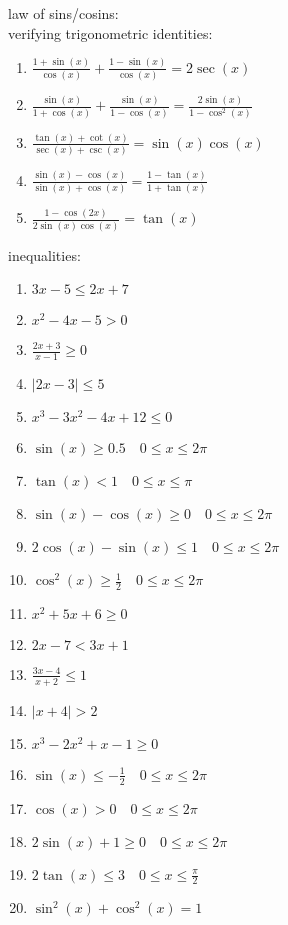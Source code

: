\documentclass{article}
\begin{document}
law of sins/cosins:\\

verifying trigonometric identities:
	\begin{enumerate}
		\item $\frac{1 + \sin(x)}{\cos(x)} + \frac{1 - \sin(x)}{\cos(x)} = 2\sec(x)$
		\item $\frac{\sin(x)}{1 + \cos(x)} + \frac{\sin(x)}{1 - \cos(x)} = \frac{2\sin(x)}{1 - \cos^2(x)}$
		\item $\frac{\tan(x) + \cot(x)}{\sec(x) + \csc(x)} = \sin(x)\cos(x)$
		\item $\frac{\sin(x) - \cos(x)}{\sin(x) + \cos(x)} = \frac{1 - \tan(x)}{1 + \tan(x)}$
		\item $\frac{1 - \cos(2x)}{2\sin(x)\cos(x)} = \tan(x)$
	\end{enumerate}

inequalities:
\begin{enumerate}
        \item $3x - 5 \leq 2x + 7$
        \item $x^2 - 4x - 5 > 0$
        \item $\frac{2x + 3}{x - 1} \geq 0$
        \item $|2x - 3| \leq 5$
        \item $x^3 - 3x^2 - 4x + 12 \leq 0$
        \item $\sin(x) \geq 0.5 \quad 0 \leq x \leq 2\pi$
        \item $\tan(x) < 1 \quad 0 \leq x \leq \pi$
        \item $\sin(x) - \cos(x) \geq 0 \quad 0 \leq x \leq 2\pi$
        \item $2\cos(x) - \sin(x) \leq 1 \quad 0 \leq x \leq 2\pi$
        \item $\cos^2(x) \geq \frac{1}{2} \quad 0 \leq x \leq 2\pi$
        \item $x^2 + 5x + 6 \geq 0$
        \item $2x - 7 < 3x + 1$
        \item $\frac{3x - 4}{x + 2} \leq 1$
        \item $|x + 4| > 2$
        \item $x^3 - 2x^2 + x - 1 \geq 0$
        \item $\sin(x) \leq -\frac{1}{2} \quad 0 \leq x \leq 2\pi$
        \item $\cos(x) > 0 \quad 0 \leq x \leq 2\pi$
        \item $2\sin(x) + 1 \geq 0 \quad 0 \leq x \leq 2\pi$
        \item $2\tan(x) \leq 3 \quad 0 \leq x \leq \frac{\pi}{2}$
        \item $\sin^2(x) + \cos^2(x) = 1$
\end{enumerate}
\end{document}

